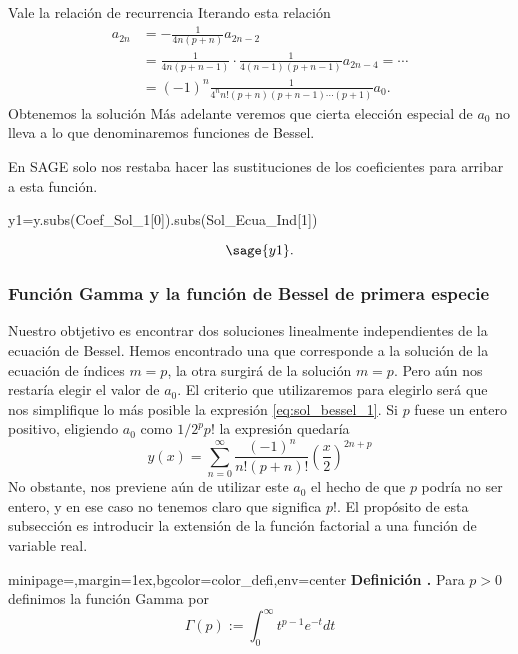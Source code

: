 \documentclass{article}
\newenvironment{colbox}[2]{%
    \begin{adjustbox}{minipage={\linewidth},margin=1ex,bgcolor=#1,env=center}
        #2}{%
    \end{adjustbox}%
}
\newcounter{defi_cont}
\newenvironment{definicion}[1]{\begin{colbox}{color_defi}{\refstepcounter{defi_cont}\textbf{Definición \arabic{defi_cont}.} #1}}{\end{colbox}}
\newcounter{cor_cont}
\renewcommand{\emph}[1]{\textcolor[rgb]{0,0,1}{#1}}
\begin{document}
Vale la relación de recurrencia
Iterando esta relación
\[
\begin{split}
  a_{2n}&=-\frac{1}{4n(p+n)}a_{2n-2}\\
       &=\frac{1}{4n(p+n-1)}\cdot\frac{1}{4(n-1)(p+n-1)}a_{2n-4}=\cdots\\
       & =(-1)^n\frac{1}{4^nn!(p+n)(p+n-1)\cdots (p+1)}a_{0}.
\end{split}
\]
Obtenemos la solución 
Más adelante veremos que cierta elección especial de $a_0$ no lleva a lo que denominaremos funciones de Bessel.

En SAGE solo nos restaba hacer las sustituciones de los coeficientes para arribar a esta función.
\begin{sageblock}
y1=y.subs(Coef_Sol_1[0]).subs(Sol_Ecua_Ind[1])
\end{sageblock}

\[\sage{y1}.\]

\subsubsection{Función Gamma y la función de Bessel de primera especie}

Nuestro obtjetivo es encontrar dos soluciones linealmente independientes de la ecuación de Bessel. Hemos encontrado una que corresponde a la solución de la ecuación de índices $m=p$, la otra surgirá de la solución $m=p$. Pero aún nos restaría elegir el valor de $a_0$. El criterio que utilizaremos para elegirlo será que nos simplifique lo más posible la expresión  \eqref{eq:sol_bessel_1}. Si $p$ fuese un entero positivo, eligiendo $a_0$ como $1/2^pp!$ la expresión quedaría
\[y(x)=\sum_{n=0}^{\infty}\frac{(-1)^n}{n!(p+n)!}\left(\frac{x}{2}\right)^{2n+p}\]
No obstante, nos previene aún de utilizar este $a_0$ el hecho de que $p$ podría no ser entero, y en ese caso no tenemos claro que significa $p!$. El propósito de esta subsección es introducir la extensión de la función factorial a una función de variable real. 

\begin{definicion}\label{def:gamma} Para $p>0$ definimos la \emph{función Gamma} por 
\begin{equation}\label{eq:gamma}\Gamma(p):=\int_0^{\infty}t^{p-1}e^{-t}dt
\end{equation}
\end{definicion}
\end{document}
